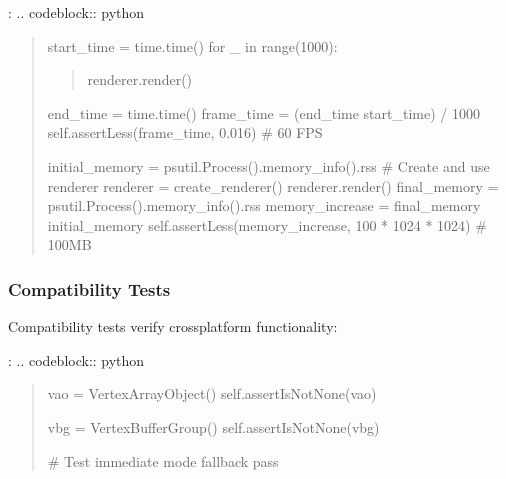 \documentclass[a4paper,10pt,english,openany,oneside]{sphinxmanual}
\begin{document}
\sphinxAtStartPar
{}:
.. code\sphinxhyphen{}block:: python
\begin{quote}
\begin{description}
\begin{description}
\sphinxAtStartPar
start\_time = time.time()
for \_ in range(1000):
\begin{quote}

\sphinxAtStartPar
renderer.render()
\end{quote}

\sphinxAtStartPar
end\_time = time.time()
frame\_time = (end\_time \sphinxhyphen{} start\_time) / 1000
self.assertLess(frame\_time, 0.016)  \# 60 FPS

\sphinxAtStartPar
initial\_memory = psutil.Process().memory\_info().rss
\# Create and use renderer
renderer = create\_renderer()
renderer.render()
final\_memory = psutil.Process().memory\_info().rss
memory\_increase = final\_memory \sphinxhyphen{} initial\_memory
self.assertLess(memory\_increase, 100 * 1024 * 1024)  \# 100MB

\end{description}

\end{description}
\end{quote}


\subsubsection{Compatibility Tests}
\label{\detokenize{testing:compatibility-tests}}
\sphinxAtStartPar
Compatibility tests verify cross\sphinxhyphen{}platform functionality:

\sphinxAtStartPar
{}:
.. code\sphinxhyphen{}block:: python
\begin{quote}
\begin{description}
\begin{description}
\begin{description}
\sphinxAtStartPar
vao = VertexArrayObject()
self.assertIsNotNone(vao)

\end{description}

\begin{description}
\sphinxAtStartPar
vbg = VertexBufferGroup()
self.assertIsNotNone(vbg)

\end{description}

\sphinxAtStartPar
\# Test immediate mode fallback
pass

\end{description}

\end{description}
\end{quote}
\end{document}
